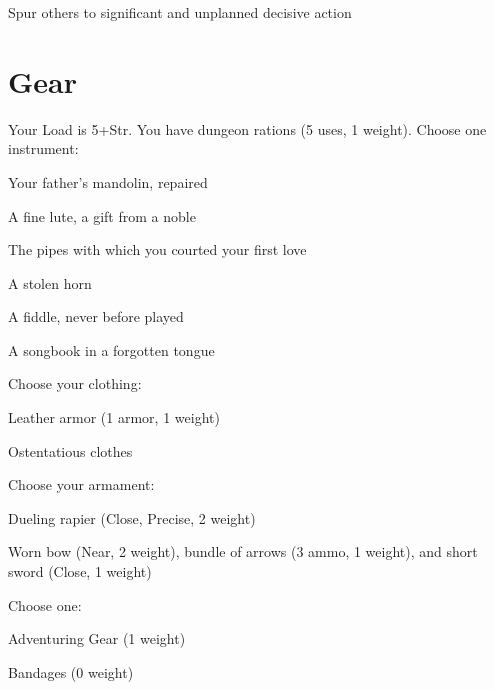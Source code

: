 Spur others to significant and unplanned decisive action



 
\section{Gear}   
 



Your Load is 5+Str. You have dungeon rations (5 uses, 1 weight). Choose one instrument:

 
\startitemize[1,packed]

\item Your father's mandolin, repaired

 
\item A fine lute, a gift from a noble

 
\item The pipes with which you courted your first love

 
\item A stolen horn

 
\item A fiddle, never before played

 
\item A songbook in a forgotten tongue


\stopitemize
 

Choose your clothing:

 
\startitemize[1,packed]

\item Leather armor  (1 armor, 1 weight)

 
\item Ostentatious clothes


\stopitemize
 

Choose your armament:

 
\startitemize[1,packed]

\item Dueling rapier (Close, Precise, 2 weight)

 
\item Worn bow (Near, 2 weight), bundle of arrows (3 ammo, 1 weight), and short sword (Close, 1 weight)


\stopitemize
 

Choose one:

 
\startitemize[1,packed]

\item Adventuring Gear (1 weight)

 
\item Bandages (0 weight)

